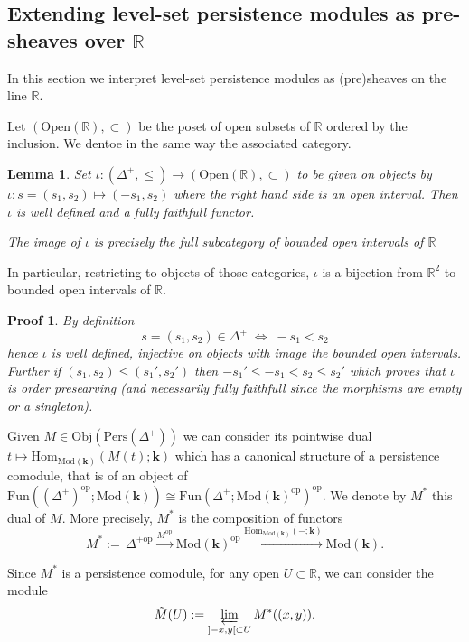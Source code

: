 \documentclass[a4paper, english, 11pt]{article}
\newcommand{\kk}[0]{\textbf{k}}
\newcommand{\Mod}[0]{\text{Mod}}
\newcommand{\Pe}{\text{Pers}}
\newcommand{\0}{\vec{0}}
\newcommand{\R}[0]{\mathbb{R}}
\newcommand{\Obj}[0]{\text{Obj}}
\newcommand{\Ouv}[0]{\mathrm{Open}}
\newcommand{\op}[0]{\text{op}}
\newcommand{\Hom}[0]{\text{Hom}}
\newtheorem*{pf}{Proof} }
\newtheorem{lem}[prop]{Lemma}
\begin{document}
\subsection{Extending level-set persistence modules as pre-sheaves over $\R$}\label{SS:levelsettopresheaves}
In this section we interpret level-set persistence modules as (pre)sheaves on the line $\R$. 


 Let $(\Ouv(\R), \subset )$ be the poset of open subsets of $\R$ ordered by the inclusion. We dentoe in the same way the associated category.  
\begin{lem} \label{L:Defiota}Set $\iota: (\Delta^+, \leq)\to (\Ouv(\R), \subset)$ to be given on objects by 
  $\iota: s=(s_1, s_2) \mapsto (-s_1, s_2)$ where the right hand side is an open interval. 
  Then $\iota$ is well defined and a fully faithfull functor.
  
  The image of $\iota$ is precisely the full subcategory of bounded open intervals of $\R$ 
\end{lem}
In particular, restricting to objects of those categories,  $\iota$ is a bijection from $\R^2$ to bounded open intervals of $\R$. 
\begin{pf}
 By definition  $$ s=(s_1, s_2)\in \Delta^+ \;\Longleftrightarrow \;-s_1<s_2$$ hence $\iota$ is well defined, injective on objects with image the bounded open intervals.  Further if $(s_1, s_2)\leq (s_1', s_2')$ then 
 $-s_1'\leq -s_1<s_2\leq s_2'$ which proves that $\iota$ is order presearving (and necessarily fully faithfull since the morphisms are empty or a singleton). 
\end{pf}



Given $M \in \Obj(\Pe(\Delta^+))$ we can consider its pointwise dual $ t\mapsto \Hom_{\Mod(\kk)}(M(t);\kk)$ which has a canonical structure of a persistence comodule, that is of an object of  
$\text{Fun}((\Delta^{+})^{\op}; \Mod(\kk))\cong \text{Fun}(\Delta^+; \Mod(\kk)^{\op})^{\op} $.  We denote by $M^*$ this dual of $M$. More precisely, $M^*$ is the composition of functors
$$M^* :=\, \Delta^{+\op} \stackrel{M^{\op}}\longrightarrow \Mod(\kk)^{\op} \stackrel{\Hom_{\Mod(\kk)}(-;\kk)}\longrightarrow \Mod(\kk). $$

Since $M^*$ is a persistence comodule, for any  open $U \subset \R$, we can consider the module 
\begin{equation}\label{eq:defMtilde} 
\Tilde{M} (U):=  \varprojlim_{]-x,y[\subset U} M^*((x,y)).\end{equation}
                                     
\end{document}
